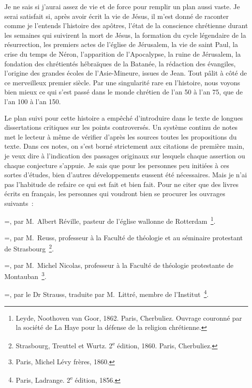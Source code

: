 \documentclass[french,twoside]{book} %
\newcommand{\biblitem}[1]{{\noindent\hangindent=\parindent   #1\par}}
\begin{document}
Je ne sais si j’aurai assez de vie et de force pour remplir un plan aussi vaste. Je serai satisfait si, après avoir écrit la vie de Jésus, il m’est donné de raconter comme je l’entends l’histoire des apôtres, l’état de la conscience chrétienne durant les semaines qui suivirent la mort de Jésus, la formation du cycle légendaire de la résurrection, les premiers actes de l’église de Jérusalem, la vie de saint Paul, la crise du temps de Néron, l’apparition de l’Apocalypse, la ruine de Jérusalem, la fondation des chrétientés hébraïques de la Batanée, la rédaction des évangiles, l’origine des grandes écoles de l’Asie-Mineure, issues de Jean. Tout pâlit à côté de ce merveilleux premier siècle. Par une singularité rare en l’histoire, nous voyons bien mieux ce qui s’est passé dans le monde chrétien de l’an 50 à l’an 75, que de l’an 100 à l’an 150.\par
Le plan suivi pour cette histoire a empêché d’introduire dans le texte de longues dissertations critiques sur les points controversés. Un système continu de notes met le lecteur à même de vérifier d’après les sources toutes les propositions du texte. Dans ces notes, on s’est borné strictement aux citations de première main, je veux dire à l’indication des passages originaux sur lesquels chaque assertion ou chaque conjecture s’appuie. Je sais que pour les personnes peu initiées à ces sortes d’études, bien d’autres développements eussent été nécessaires. Mais je n’ai pas l’habitude de refaire ce qui est fait et bien fait. Pour ne citer que des livres écrits en français, les personnes qui voudront bien se procurer les ouvrages suivants :\par
\biblitem{{\itshape Études critiques sur l’Évangile de saint Matthieu}, par M. Albert Réville, pasteur de l’église wallonne de Rotterdam \footnote{Leyde, Noothoven van Goor, 1862. Paris, Cherbuliez. Ouvrage couronné par la société de La Haye pour la défense de la religion chrétienne.}.}
\biblitem{{\itshape Histoire de la théologie chrétienne au siècle apostolique}, par M. Reuss, professeur à la Faculté de théologie et au séminaire protestant de Strasbourg \footnote{ Strasbourg, Treuttel et Wurtz. 2\textsuperscript{e} édition, 1860. Paris, Cherbuliez.}.}
\biblitem{{\itshape Des doctrines religieuses des Juifs pendant les deux siècles antérieurs à l’ère chrétienne}, par M. Michel Nicolas, professeur à la Faculté de théologie protestante de Montauban \footnote{Paris, Michel Lévy frères, 1860.}.}
\biblitem{{\itshape Vie de Jésus}, par le Dr Strauss, traduite par M. Littré, membre de l’Institut \footnote{ Paris, Ladrange. 2\textsuperscript{e} édition, 1856.}.}
\end{document}
